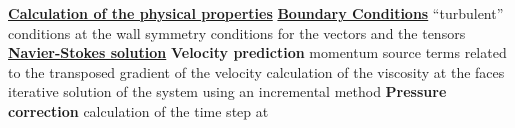 \begin{table}[htp]
\underline{\textbf{Calculation of the physical properties}}\newline
\underline{\textbf{Boundary Conditions}}\newline
\hspace*{1cm} \newline
\hspace*{1,5cm} \hspace*{1cm} ``turbulent'' conditions at the
wall\newline
\hspace*{1,5cm} \hspace*{1cm} symmetry conditions for the
vectors and the tensors\newline
\underline{\textbf{Navier-Stokes solution}}\newline
\hspace*{1cm}\newline
\hspace*{1,5cm}\textbf{Velocity prediction}\newline
\hspace*{2,0cm} \newline
\hspace*{2,5cm} \hspace*{1cm} momentum source terms related to
the \newline
\hspace*{4,5cm} \hspace*{1cm} transposed gradient of the velocity\newline
\hspace*{2,5cm} \hspace*{1cm} calculation of the viscosity at
the faces\newline
\hspace*{2,5cm} \hspace*{1cm} iterative solution of the system
using an incremental method\newline
\hspace*{1,5cm}\textbf{Pressure correction}\newline
\hspace*{2,0cm} \newline
\hspace*{2,5cm} \hspace*{1cm}calculation of the time step at

\end{table}
